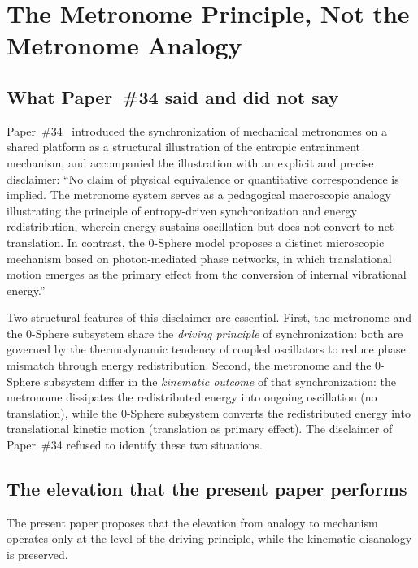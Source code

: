 \documentclass[%
 reprint, amsmath,amssymb, aps, prb, ]{revtex4-2}
\numberwithin{equation}{section}
\begin{document}
\section{The Metronome Principle, Not the Metronome Analogy}
\label{sec:metronome}

\subsection{What Paper~\#34 said and did not say}

Paper~\#34~\cite{hanamura34} introduced the synchronization of mechanical metronomes on a shared platform as a structural illustration of the entropic entrainment mechanism, and accompanied the illustration with an explicit and precise disclaimer: ``No claim of physical equivalence or quantitative correspondence is implied. The metronome system serves as a pedagogical macroscopic analogy illustrating the principle of entropy-driven synchronization and energy redistribution, wherein energy sustains oscillation but does not convert to net translation. In contrast, the 0-Sphere model proposes a distinct microscopic mechanism based on photon-mediated phase networks, in which translational motion emerges as the primary effect from the conversion of internal vibrational energy.''

Two structural features of this disclaimer are essential. First, the metronome and the 0-Sphere subsystem share the \emph{driving principle} of synchronization: both are governed by the thermodynamic tendency of coupled oscillators to reduce phase mismatch through energy redistribution. Second, the metronome and the 0-Sphere subsystem differ in the \emph{kinematic outcome} of that synchronization: the metronome dissipates the redistributed energy into ongoing oscillation (no translation), while the 0-Sphere subsystem converts the redistributed energy into translational kinetic motion (translation as primary effect). The disclaimer of Paper~\#34 refused to identify these two situations.

\subsection{The elevation that the present paper performs}

The present paper proposes that the elevation from analogy to mechanism operates only at the level of the driving principle, while the kinematic disanalogy is preserved.
\end{document}
